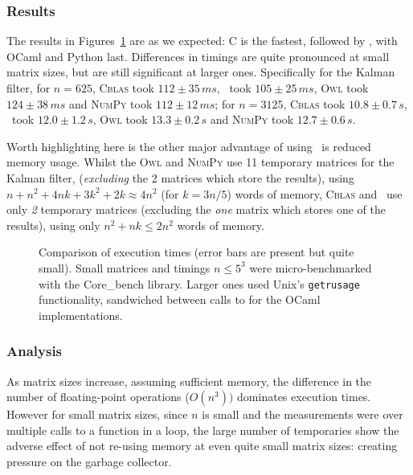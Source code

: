 \subsubsection{Results}


The results in Figures~\ref{fig:timings} are as we expected: C is the fastest,
followed by \lang, with OCaml and Python last.  Differences in timings are
quite pronounced at small matrix sizes, but are still significant at larger
ones. Specifically for the Kalman filter, for $n=625$, \textsc{Cblas} took $112
\pm 35\, ms$, \lang\ took $105 \pm 25 \, ms$, \textsc{Owl} took $124 \pm 38\,
ms$ and \textsc{NumPy} took $112 \pm 12\, ms$;  for $n=3125$, \textsc{Cblas}
took $10.8 \pm 0.7\, s$, \lang\ took $12.0 \pm 1.2 \, s$, \textsc{Owl} took
$13.3 \pm 0.2\, s$ and \textsc{NumPy} took $12.7 \pm 0.6\, s$.

Worth highlighting here is the other major advantage of using \lang\ is reduced
memory usage.  Whilst the \textsc{Owl} and \textsc{NumPy} use 11 temporary
matrices for the Kalman filter, (\emph{excluding} the 2 matrices which store
the results), using $n + n^2 + 4nk + 3k^2 + 2k \approx 4n^2$ (for $k = 3n/5$)
words of memory, \textsc{Cblas} and \lang\ use only \emph{2} temporary
matrices (excluding the \emph{one} matrix which stores one of the results),
using only $n^2 + nk \leq 2n^2$ words of memory.

\begin{figure}[t]
    \centering
    
    \begin{minipage}{.49\textwidth}
        \centering
        
    \end{minipage}
    \begin{minipage}{.49\textwidth}
        \centering
        
    \end{minipage}
    \caption{Comparison of execution times (error bars are present but quite
        small). Small matrices and timings $n \le 5^3$ were micro-benchmarked
        with the Core\_bench library. Larger ones used Unix's
        \texttt{getrusage} functionality, sandwiched between calls to
         for the OCaml implementations.}\label{fig:timings}
\end{figure}

\subsubsection{Analysis}

As matrix sizes increase, assuming sufficient memory, the difference in the
number of floating-point operations ($O(n^3))$ dominates execution times.
However for small matrix sizes, since $n$ is small and the measurements were
over multiple calls to a function in a loop, the large number of temporaries
show the adverse effect of not re-using memory at even quite small matrix
sizes: creating pressure on the garbage collector.

